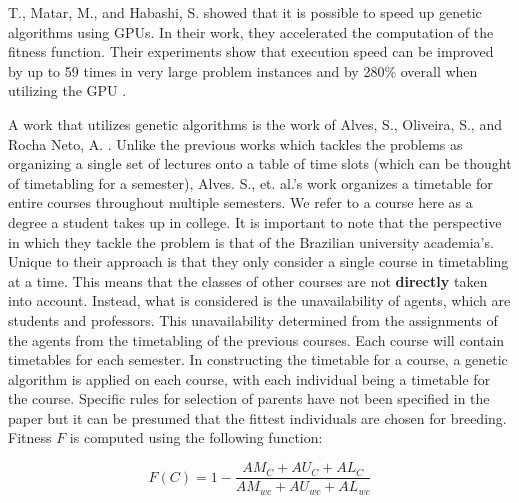 T., Matar, M., and Habashi, S. showed that it is possible to speed up genetic algorithms using GPUs. In their work, they accelerated the computation of the fitness function. Their experiments show that execution speed can be improved by up to 59 times in very large problem instances and by 280\% overall when utilizing the GPU \cite{yousef-gpu-ga}. 

A work that utilizes genetic algorithms is the work of Alves, S., Oliveira, S., and Rocha Neto, A. \cite{alves-novel-recursive}. Unlike the previous works which tackles the problems as organizing a single set of lectures onto a table of time slots (which can be thought of timetabling for a semester), Alves. S., et. al.'s work organizes a timetable for entire courses throughout multiple semesters. We refer to a course here as a degree a student takes up in college. It is important to note that the perspective in which they tackle the problem is that of the Brazilian university academia's. Unique to their approach is that they only consider a single course in timetabling at a time. This means that the classes of other courses are not \textbf{directly} taken into account. Instead, what is considered is the unavailability of agents, which are students and professors. This unavailability determined from the assignments of the agents from the timetabling of the previous courses. Each course will contain timetables for each semester. In constructing the timetable for a course, a genetic algorithm is applied on each course, with each individual being a timetable for the course. Specific rules for selection of parents have not been specified in the paper but it can be presumed that the fittest individuals are chosen for breeding. Fitness $F$ is computed using the following function:

\[
	F(C) = 1 - \frac{AM_{C} + AU_{C} + AL_{C}}{AM_{wc} + AU_{wc} + AL_{wc}}
\]

